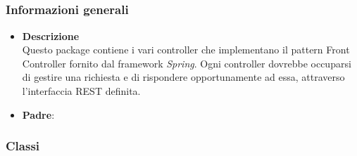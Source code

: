 \subsection{}
\label{\nogloxy{swedesigner::server::controller}}
\subsubsection{Informazioni generali}
\begin{itemize}
\item \textbf{Descrizione}\\
Questo package contiene i vari controller che implementano il pattern Front Controller fornito dal framework \emph{Spring}. Ogni controller dovrebbe occuparsi di gestire una richiesta e di rispondere opportunamente ad essa, attraverso l'interfaccia REST definita.
\item \textbf{Padre}: \hyperref[\nogloxy{swedesigner::server}]{}
\end{itemize}
\subsubsection{Classi}
\label{\nogloxy{swedesigner::server::controller::RequestHandlerController}}
\begin{figure}[h]
\centering
{}
\caption{}
\end{figure}

